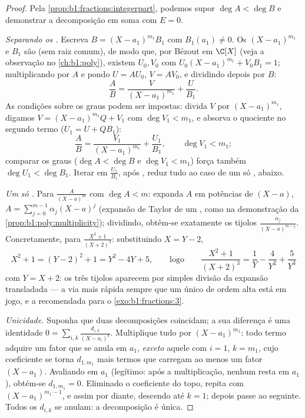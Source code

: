 \begin{proof}
Pela \cref{prop:b1:fractions:integerpart}, podemos supor $\deg A < \deg
B$
e demonstrar a decomposição em soma com $E = 0$.

\emph{Separando os .} Escreva $B = (X - a_1)^{m_1} B_1$ com
$B_1(a_1) \neq 0$. Os  $(X-a_1)^{m_1}$ e $B_1$ são
 (sem raiz comum), de modo que, por Bézout em $\C[X]$
(veja a observação no \cref{ch:b1:poly}), existem $U_0, V_0$ com $U_0 (X-a_1)^{m_1} +
V_0 B_1 = 1$; multiplicando por $A$ e pondo $U = AU_0$, $V =
AV_0$, e dividindo depois por $B$:
\[
\frac AB = \frac{V}{(X - a_1)^{m_1}} + \frac{U}{B_1} .
\]
As condições sobre os graus podem ser impostas: divida $V$ por
$(X-a_1)^{m_1}$, digamos $V = (X-a_1)^{m_1}Q + V_1$ com $\deg V_1 <
m_1$, e absorva o quociente no segundo termo ($U_1 = U +
QB_1$):
\[
\frac AB = \frac{V_1}{(X - a_1)^{m_1}} + \frac{U_1}{B_1},
\qquad \deg V_1 < m_1 ;
\]
comparar os graus ($\deg A < \deg B$ e $\deg V_1 < m_1$) força
também $\deg U_1 < \deg B_1$. Iterar em $\frac{U_1}{B_1}$,
 após , reduz tudo ao caso de um só , abaixo.

\emph{Um só .} Para $\frac{A}{(X-a)^m}$ com $\deg A < m$: expanda $A$
em potências de $(X - a)$, $A = \sum_{j=0}^{m-1} \alpha_j (X - a)^j$
(expansão de Taylor de um , como na demonstração da
\cref{prop:b1:poly:multiplicity}); dividindo, obtêm-se exatamente os tijolos
$\frac{\alpha_j}{(X-a)^{m-j}}$. Concretamente, para $\frac{X^2 +
1}{(X+2)^3}$: substituindo $X = Y - 2$,
\[
X^2 + 1 = (Y - 2)^2 + 1 = Y^2 - 4Y + 5 ,
\qquad\text{logo}\qquad
\frac{X^2+1}{(X+2)^3} = \frac1{Y} - \frac4{Y^2} + \frac5{Y^3}
\]
com $Y = X + 2$: os três tijolos aparecem por simples divisão da
expansão transladada --- a via mais rápida sempre que um único
 de ordem alta está em jogo, e a recomendada para o
\cref{exo:b1:fractions:3}.

\emph{Unicidade.} Suponha que duas decomposições coincidam; a sua
diferença é uma identidade $0 = \sum_{i,k} \frac{d_{i,k}}{(X -
a_i)^k}$. Multiplique tudo por $(X - a_1)^{m_1}$: todo termo
adquire um fator que se anula em $a_1$, \emph{exceto} aquele com
$i = 1$, $k = m_1$, cujo coeficiente se torna $d_{1,m_1}$ mais
termos que carregam ao menos um fator $(X - a_1)$. Avaliando em
$a_1$ (legítimo: após a multiplicação, nenhum  resta em
$a_1$), obtém-se $d_{1,m_1} = 0$. Eliminado o coeficiente do topo,
repita com $(X - a_1)^{m_1 - 1}$, e assim por diante, descendo até $k = 1$;
depois passe ao  seguinte. Todos os $d_{i,k}$ se anulam: a
decomposição é única.
\end{proof}

